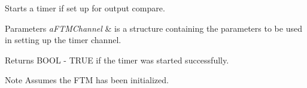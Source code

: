 Starts a timer if set up for output compare. 


\begin{DoxyParams}{Parameters}
{\em a\+F\+T\+M\+Channel} & is a structure containing the parameters to be used in setting up the timer channel. \\
\hline
\end{DoxyParams}
\begin{DoxyReturn}{Returns}
B\+O\+O\+L -\/ T\+R\+U\+E if the timer was started successfully. 
\end{DoxyReturn}
\begin{DoxyNote}{Note}
Assumes the F\+T\+M has been initialized. 
\end{DoxyNote}
